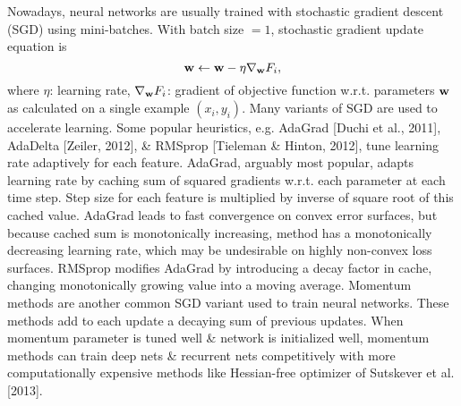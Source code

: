\documentclass{article}
\begin{document}
\begin{enumerate}
\begin{itemize}
\begin{itemize}
			Nowadays, neural networks are usually trained with stochastic gradient descent (SGD) using mini-batches. With batch size $= 1$, stochastic gradient update equation is
			\begin{equation}
				{\bf w}\leftarrow{\bf w} - \eta\nabla_{\bf w}F_i,
			\end{equation}
			where $\eta$: learning rate, $\nabla_{\bf w}F_i$: gradient of objective function w.r.t. parameters ${\bf w}$ as calculated on a single example $(x_i,y_i)$. Many variants of SGD are used to accelerate learning. Some popular heuristics, e.g. AdaGrad [Duchi et al., 2011], AdaDelta [Zeiler, 2012], \& RMSprop [Tieleman \& Hinton, 2012], tune learning rate adaptively for each feature. AdaGrad, arguably most popular, adapts learning rate by caching sum of squared gradients w.r.t. each parameter at each time step. Step size for each feature is multiplied by inverse of square root of this cached value. AdaGrad leads to fast convergence on convex error surfaces, but because cached sum is monotonically increasing, method has a monotonically decreasing learning rate, which may be undesirable on highly non-convex loss surfaces. RMSprop modifies AdaGrad by introducing a decay factor in cache, changing monotonically growing value into a moving average. Momentum methods are another common SGD variant used to train neural networks. These methods add to each update a decaying sum of previous updates. When momentum parameter is tuned well \& network is initialized well, momentum methods can train deep nets \& recurrent nets competitively with more computationally expensive methods like Hessian-free optimizer of Sutskever et al. [2013].
			

\end{itemize}
\end{itemize}
\end{enumerate}
\end{document}
